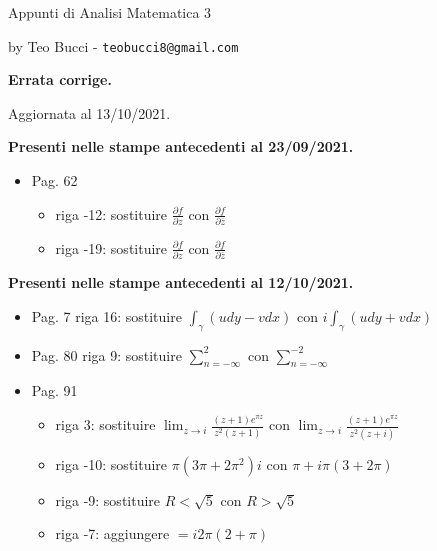 \documentclass[10pt,a4paper]{article}
\begin{document}

{\Huge {Appunti di Analisi Matematica 3}} %

\vspace*{0.2cm}

by Teo Bucci - \texttt{teobucci8@gmail.com}

\vspace*{0.5cm}

{\Large \textbf{Errata corrige.}}

\vspace*{0.5cm}

Aggiornata al 13/10/2021.

\vspace*{0.5cm}


\textbf{Presenti nelle stampe antecedenti al 23/09/2021.}
\begin{itemize}
	\item Pag. 62
	\begin{itemize}
		\item riga -12: sostituire $\frac{\partial f}{\partial z}$ con $\frac{\partial f}{\partial \overline{z}}$
		\item riga -19: sostituire $\frac{\partial f}{\partial z}$ con $\frac{\partial f}{\partial \overline{z}}$
	\end{itemize}
\end{itemize}


\textbf{Presenti nelle stampe antecedenti al 12/10/2021.}
\begin{itemize}
	\item Pag. 7 riga 16: sostituire $\int _{\gamma }( udy-vdx)$ con $i\int _{\gamma }( udy+vdx)$
	\item Pag. 80 riga 9: sostituire $\sum ^{2}_{n=-\infty }$ con $\sum ^{-2}_{n=-\infty }$
	\item Pag. 91
	\begin{itemize}
		\item riga 3: sostituire $\lim _{z\rightarrow i}\frac{\left( z+1\right) e^{\pi z}}{z^{2}\left( z+1\right)}$ con $\lim _{z\rightarrow i}\frac{\left( z+1\right) e^{\pi z}}{z^{2}\left( z+i\right)}$
		\item riga -10: sostituire $\pi \left( 3\pi +2\pi ^{2}\right) i$ con $\pi +i\pi \left( 3 +2\pi\right)$
		\item riga -9: sostituire $R< \sqrt{5}$ con $R> \sqrt{5}$
		\item riga -7: aggiungere $= i2\pi (2+\pi )$
	\end{itemize}
\end{itemize}
\end{document}
